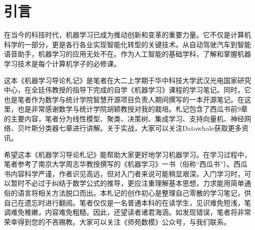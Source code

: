 \section{引言}

在当今的科技时代，机器学习已成为推动创新和变革的重要力量。它不仅是计算机科学的一部分，更是各行各业实现智能化转型的关键技术。从自动驾驶汽车到智能语音助手，机器学习的应用无处不在。作为人工智能的基础学科，了解和掌握机器学习技术是每个计算机学子的必修课。

这本《机器学习导论札记》是笔者在大二上学期于华中科技大学武汉光电国家研究中心，在全廷伟教授的指导下完成的自学《机器学习》课程的学习笔记。同时，它也是笔者作为数学与统计学院智慧开源项目负责人期间撰写的一本开源笔记。在这里，也是非常感谢数学与统计学院胡颖教授对我的栽培。札记包含了西瓜书前9章的主要内容，笔者分为线性模型、聚类、决策树、集成学习、支持向量机、神经网络、贝叶斯分类器七章进行讲解。关于实战，大家可以关注Datawhale获取更多资讯。

希望这本《机器学习导论札记》能帮助大家更好地学习机器学习。在学习过程中，笔者参考了南京大学周志华教授撰写的《机器学习》一书（俗称“西瓜书”）。西瓜书内容科学严谨，作者识见高远，但对入门者来说可能稍显艰深。入门学习时，可以暂时不必过于纠结于数学公式的推导，更应注重理解基本思想，力求能用简单通俗的语言将相关方法脱口而出。本札记的创作初心是整理自己零散的学习笔记，供自己在遗忘时进行翻阅。笔者仅仅是一名普通本科的在读学生，见识难免短浅，笔调难免稚嫩，内容难免粗糙。因此，还望读者诸君海涵。如发现错误，笔者将非常荣幸得到您的不吝赐教。大家可以关注《师苑数模》公众号，与我们联系。